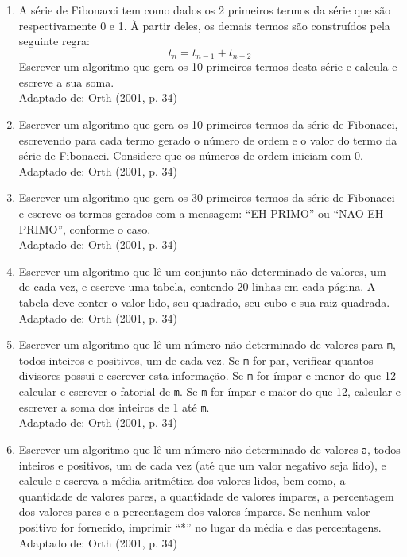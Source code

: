 \documentclass[onecolumn,a4paper,10pt]{report}
\newcommand{\+}{\, + \,}
\newcommand{\<}{\hspace*{-0.4cm}}
\begin{document}
\begin{enumerate}[1.]
\item A série de Fibonacci tem como dados os 2 primeiros termos da série que são respectivamente 0 e 1. À partir deles, os demais termos são construídos pela seguinte regra:
\[ t_{n} = t_{n-1} + t_{n-2} \]
Escrever um algoritmo que gera os 10 primeiros termos desta série e calcula e escreve a sua soma.\\
{\tiny Adaptado de: Orth (2001, p. 34)}

\item Escrever um algoritmo que gera os 10 primeiros termos da série de Fibonacci, escrevendo para cada termo gerado o número de ordem e o valor do termo da série de Fibonacci. Considere que os números de ordem iniciam com 0.\\
{\tiny Adaptado de: Orth (2001, p. 34)}

\item Escrever um algoritmo que gera os 30 primeiros termos da série de Fibonacci e escreve os termos gerados com a mensagem: ``EH PRIMO'' ou ``NAO EH PRIMO'', conforme o caso.\\
{\tiny Adaptado de: Orth (2001, p. 34)}

\item Escrever um algoritmo que lê um conjunto não determinado de valores, um de cada vez, e escreve uma tabela, contendo 20 linhas em cada página. A tabela deve conter o valor lido, seu quadrado, seu cubo e sua raiz quadrada.\\
{\tiny Adaptado de: Orth (2001, p. 34)}

\item Escrever um algoritmo que lê um número não determinado de valores para \texttt{m}, todos inteiros e positivos, um de cada vez. Se \texttt{m} for par, verificar quantos divisores possui e escrever esta informação. Se \texttt{m} for ímpar e menor do que 12 calcular e escrever o fatorial de \texttt{m}. Se \texttt{m} for ímpar e maior do que 12, calcular e escrever a soma dos inteiros de 1 até \texttt{m}.\\
{\tiny Adaptado de: Orth (2001, p. 34)}

\item Escrever um algoritmo que lê um número não determinado de valores \texttt{a}, todos inteiros e positivos, um de cada vez (até que um valor negativo seja lido), e calcule e escreva a média aritmética dos valores lidos, bem como, a quantidade de valores pares, a quantidade de valores ímpares, a percentagem dos valores pares e a percentagem dos valores ímpares. Se nenhum valor positivo for fornecido, imprimir ``*'' no lugar da média e das percentagens.\\
{\tiny Adaptado de: Orth (2001, p. 34)}


\end{enumerate}
\end{document}
